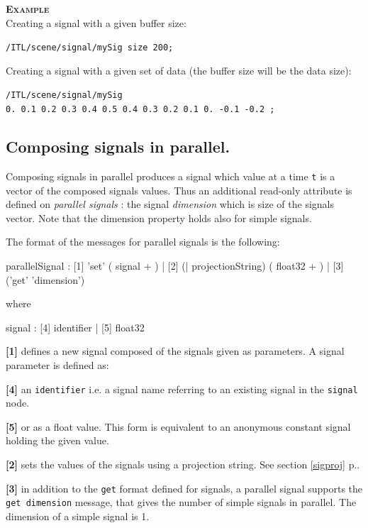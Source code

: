 \documentclass[a4paper,twoside]{report}
\newcommand{\subsublevel}[1]	{\subsection{#1}}
\newcommand{\fullref}[1]	{\ref{#1} p.\pageref{#1}}
\newcommand{\OSC}[1]		{\texttt{#1}}
\newcommand{\values}[1]		{\texttt{#1}}
\newcommand{\example}		{\textbf{\hspace{-1.5cm}\textbf{\textsc{Example }}}}
\let\olditemize\itemize
\let\oldenditemize\enditemize
\renewenvironment{itemize} 	{\olditemize \setlength{\itemsep}{1mm}}{\oldenditemize}
\newcommand{\sample}	[1]			{\vspace{-2mm}\begin{center}\colorbox{mygrey}{
								\begin{minipage}[t]{0.9\columnwidth} 
								{\small \texttt{#1}}
								\end{minipage}}\end{center}}
\begin{document}
\example \\
Creating a signal with a given buffer size:
\sample{/ITL/scene/signal/mySig size 200;}
Creating a signal with a given set of data (the buffer size will be the data size):
\sample{/ITL/scene/signal/mySig 0.\ 0.1\ 0.2\ 0.3\ 0.4\ 0.5\ 0.4\ 0.3\ 0.2\ 0.1\ 0.\ -0.1\ -0.2 ;}


\subsublevel{Composing signals in parallel.}\label{parcomp}
Composing signals in parallel produces a signal which value at a time \values{t} is a vector of the composed signals values. Thus an additional read-only attribute is defined on \emph{parallel signals} : the signal \emph{dimension} which is size of the signals vector. Note that the dimension property holds also for simple signals.

The format of the messages for parallel signals is the following:
\begin{rail}
parallelSignal :  
		  [1] 'set' ( signal + )
		| [2] (| projectionString) ( float32 + )
		| [3] ('get' 'dimension') 
\end{rail}
where 
\begin{rail}
signal :  
		  [4] identifier
		| [5] float32
\end{rail}

\begin{itemize}
\item \textbf{[1]} defines a new signal composed of the signals given as parameters. A signal parameter is defined as:

\begin{itemize}
\item \textbf{[4]} an \OSC{identifier} i.e. a signal name referring to an existing signal in the \OSC{signal} node. 
\item \textbf{[5]} or as a float value. This form is equivalent to an anonymous constant signal holding the given value. 
\end{itemize}

\item \textbf{[2]} sets the values of the signals using a projection string. See section \fullref{sigproj}. 
\item \textbf{[3]} in addition to the \OSC{get} format defined for signals, a parallel signal supports the \OSC{get dimension} message, that gives the number of simple signals in parallel. The dimension of a simple signal is 1. 
\end{itemize}
\end{document}
